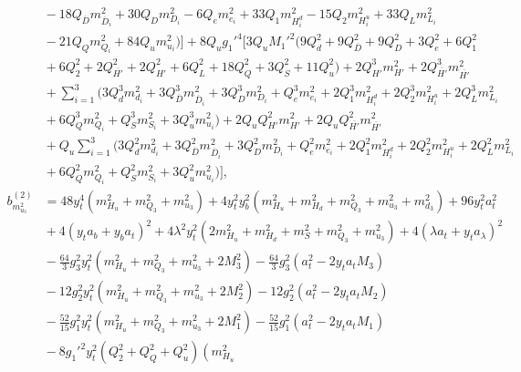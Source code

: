 \documentclass[preprint,amsmath,amssymb,aps,superscriptaddress,prd,
showpacs,floatfix,nofootinbib]{revtex4-1}
\begin{document}
\begin{subequations}
\begin{align}
& {} - 18 Q_{\overline{D}} m_{\overline{D}_i}^2 + 30 Q_D m_{D_i}^2 -
6 Q_e m_{e_i}^2 + 33 Q_1 m_{H_i^d}^2 - 15 Q_2 m_{H_i^u}^2 + 33 Q_L m_{L_i}^2
\nonumber \\
& {} - 21 Q_Q m_{Q_i}^2 + 84 Q_u m_{u_i}^2 \big ) \bigg ] +
8 Q_u g_1'^4 \bigg [ 3 Q_u M_1'^2 \big ( 9 Q_d^2 + 9 Q_{\overline{D}}^2 +
9 Q_D^2 + 3 Q_e^2 + 6 Q_1^2 \nonumber \\
& {} + 6 Q_2^2 + 2 Q_{\overline{H'}}^2 + 2 Q_{H'}^2 + 6 Q_L^2 + 18 Q_Q^2 +
3 Q_S^2 + 11 Q_u^2 \big ) + 2 Q_{H'}^3 m_{H'}^2 +
2 Q_{\overline{H'}}^3 m_{\overline{H'}}^2 \nonumber \\
& {} + \sum_{i=1}^3 \big ( 3 Q_d^3 m_{d_i}^2 +
3 Q_{\overline{D}}^3 m_{\overline{D}_i}^2 + 3 Q_D^3 m_{D_i}^2 +
Q_e^3 m_{e_i}^2 + 2 Q_1^3 m_{H_i^d}^2 + 2 Q_2^3 m_{H_i^u}^2 +
2 Q_L^3 m_{L_i}^2 \nonumber \\
& {} + 6 Q_Q^3 m_{Q_i}^2 + Q_S^3 m_{S_i}^2 + 3 Q_u^3 m_{u_i}^2 \big ) +
2 Q_u Q_{H'}^2 m_{H'}^2 + 2 Q_u Q_{\overline{H'}}^2 m_{\overline{H'}}^2
\nonumber \\
& {} + Q_u \sum_{i=1}^3 \big ( 3 Q_d^2 m_{d_i}^2 +
3 Q_{\overline{D}}^2 m_{\overline{D}_i}^2 + 3 Q_D^2 m_{D_i}^2 +
Q_e^2 m_{e_i}^2 + 2 Q_1^2 m_{H_i^d}^2 + 2 Q_2^2 m_{H_i^u}^2 +
2 Q_L^2 m_{L_i}^2 \nonumber \\
& {} + 6 Q_Q^2 m_{Q_i}^2 + Q_S^2 m_{S_i}^2 + 3 Q_u^2 m_{u_i}^2 \big )
\bigg ] , \label{eq:USSMmu222BetaTwoLoop} \\
b_{m_{u_3}^2}^{(2)} &= 48 y_t^4 \left ( m_{H_u}^2 + m_{Q_3}^2 + m_{u_3}^2
\right ) + 4 y_t^2 y_b^2 \left ( m_{H_u}^2 + m_{H_d}^2 + m_{Q_3}^2 +
m_{u_3}^2 + m_{d_3}^2 \right ) + 96 y_t^2 a_t^2 \nonumber \\
& {} + 4 \left ( y_t a_b + y_b a_t \right )^2 + 4 \lambda^2 y_t^2 \left (
2 m_{H_u}^2 + m_{H_d}^2 + m_S^2 + m_{Q_3}^2 + m_{u_3}^2 \right ) +
4 \left ( \lambda a_t + y_t a_\lambda \right )^2 \nonumber \\
& {} - \frac{64}{3} g_3^2 y_t^2 \left ( m_{H_u}^2 + m_{Q_3}^2 + m_{u_3}^2 +
2 M_3^2 \right ) - \frac{64}{3} g_3^2 \left ( a_t^2 - 2 y_t a_t M_3 \right )
\nonumber \\
& {} - 12 g_2^2 y_t^2 \left ( m_{H_u}^2 + m_{Q_3}^2 + m_{u_3}^2 + 2 M_2^2
\right ) - 12 g_2^2 \left ( a_t^2 - 2 y_t a_t M_2 \right ) \nonumber \\
& {} - \frac{52}{15} g_1^2 y_t^2 \left ( m_{H_u}^2 + m_{Q_3}^2 + m_{u_3}^2 +
2 M_1^2 \right ) - \frac{52}{15} g_1^2 \left ( a_t^2 - 2 y_t a_t M_1 \right )
\nonumber \\
& {} - 8 g_1'^2 y_t^2 \left ( Q_2^2 + Q_Q^2 + Q_u^2 \right ) \left ( m_{H_u}^2

\end{align}
\end{subequations}
\end{document}
